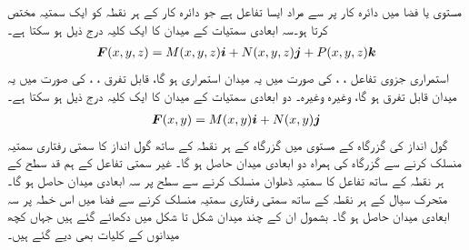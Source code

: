 مستوی یا فضا میں دائرہ کار پر   سے مراد ایسا تفاعل ہے جو دائرہ کار کے ہر نقطہ کو ایک سمتیہ مختص کرتا ہو۔سہ ابعادی سمتیات کے میدان کا ایک کلیہ درج ذیل ہو سکتا ہے۔
\begin{align*}
{\ensuremath{{\boldsymbol{F}}}}(x,y,z)=M(x,y,z){\boldsymbol{i}}+N(x,y,z){\boldsymbol{j}}+P(x,y,z){\boldsymbol{k}}
\end{align*}
استمراری جزوی تفاعل ، ،  کی صورت میں یہ میدان استمراری ہو گا، قابل تفرق ، ،  کی صورت میں یہ میدان قابل تفرق ہو گا، وغیرہ وغیرہ۔ دو ابعادی سمتیات کے میدان کا ایک کلیہ درج ذیل ہو سکتا ہے۔
\begin{align*}
{\ensuremath{{\boldsymbol{F}}}}(x,y)=M(x,y){\boldsymbol{i}}+N(x,y){\boldsymbol{j}}
\end{align*}
گول انداز کی گزرگاہ کے مستوی میں  گزرگاہ کے ہر نقطہ کے ساتھ گول انداز کا سمتی رفتاری سمتیہ منسلک کرنے سے گزرگاہ  کی ہمراہ دو ابعادی میدان حاصل ہو گا۔  غیر سمتی تفاعل کے ہم قد سطح کے ہر نقطہ کے ساتھ  تفاعل کا سمتیہ ڈھلوان منسلک کرنے سے سطح پر سہ ابعادی میدان حاصل ہو گا۔   متحرک سیال کے ہر نقطہ کے ساتھ سمتی رفتاری سمتیہ منسلک کرنے سے فضا میں اس خطہ پر سہ ابعادی  میدان حاصل ہو گا۔ بشمول ان  کے چند  میدان  شکل  تا شکل  میں دکھائے گئے ہیں جہاں کچھ میدانوں کے کلیات بھی دیے گئے ہیں۔
 
